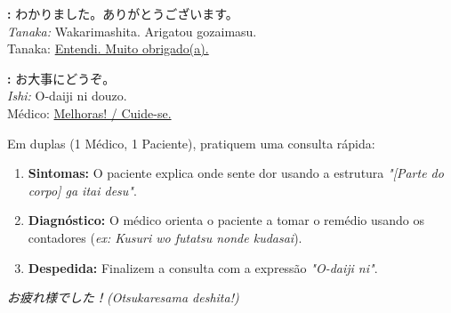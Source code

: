 \documentclass[12pt,a4paper]{article}
\begin{document}
\textbf{:} わかりました。ありがとうございます。\\
\textit{Tanaka:} Wakarimashita. Arigatou gozaimasu.\\
Tanaka: \underline{Entendi. Muito obrigado(a).} 

\vspace{0.4em}

\textbf{:} お大事にどうぞ。\\
\textit{Ishi:} O-daiji ni douzo.\\
Médico: \underline{Melhoras! / Cuide-se.} 

\newpage

\vspace{0.5cm}

\begin{tcolorbox}[colback=jppurple!6, colframe=jppurple, title=\textbf{Dinâmica em Grupo (Simulação de Consulta)}, fonttitle=\bfseries]
\small
Em duplas (1 Médico, 1 Paciente), pratiquem uma consulta rápida:
\begin{enumerate}[leftmargin=*]
    \item \textbf{Sintomas:} O paciente explica onde sente dor usando a estrutura \textit{"[Parte do corpo] ga itai desu"}.
    \item \textbf{Diagnóstico:} O médico orienta o paciente a tomar o remédio usando os contadores (\textit{ex: Kusuri wo futatsu nonde kudasai}).
    \item \textbf{Despedida:} Finalizem a consulta com a expressão \textit{"O-daiji ni"}.
\end{enumerate}
\end{tcolorbox}

\vspace{0.4cm}

\begin{center}
    \small\color{gray} \textit{お疲れ様でした！(Otsukaresama deshita!)}
\end{center}
\end{document}
